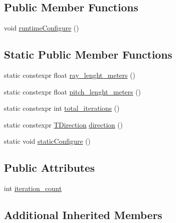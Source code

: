 \subsection*{Public Member Functions}
\begin{DoxyCompactItemize}
\item 
void \hyperlink{structsm__ridgeback__floor__coverage__static__1_1_1SS4_1_1SsFPattern1_a24f78141367de57a9927ee138c875f61}{runtime\+Configure} ()
\end{DoxyCompactItemize}
\subsection*{Static Public Member Functions}
\begin{DoxyCompactItemize}
\item 
static constexpr float \hyperlink{structsm__ridgeback__floor__coverage__static__1_1_1SS4_1_1SsFPattern1_ad6cd8f43e258cacbde1b2769faba101f}{ray\+\_\+lenght\+\_\+meters} ()
\item 
static constexpr float \hyperlink{structsm__ridgeback__floor__coverage__static__1_1_1SS4_1_1SsFPattern1_a5b8c47a8eedb90f7e1ff8d9dd0665687}{pitch\+\_\+lenght\+\_\+meters} ()
\item 
static constexpr int \hyperlink{structsm__ridgeback__floor__coverage__static__1_1_1SS4_1_1SsFPattern1_a569b2fe5bdabbd25c3c501d50e87d570}{total\+\_\+iterations} ()
\item 
static constexpr \hyperlink{namespacesm__ridgeback__floor__coverage__static__1_1_1f__pattern__states_ad85e4f6b7cecf87bbe0eef96a899de72}{T\+Direction} \hyperlink{structsm__ridgeback__floor__coverage__static__1_1_1SS4_1_1SsFPattern1_ab6706712510ff56d7a672a349d0d1b63}{direction} ()
\item 
static void \hyperlink{structsm__ridgeback__floor__coverage__static__1_1_1SS4_1_1SsFPattern1_a18194d011747edda9d4819816e339cde}{static\+Configure} ()
\end{DoxyCompactItemize}
\subsection*{Public Attributes}
\begin{DoxyCompactItemize}
\item 
int \hyperlink{structsm__ridgeback__floor__coverage__static__1_1_1SS4_1_1SsFPattern1_a7bd988f5e0b7033d14d151da3ef3613a}{iteration\+\_\+count}
\end{DoxyCompactItemize}
\subsection*{Additional Inherited Members}



